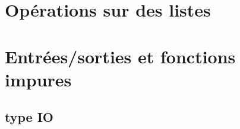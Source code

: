 \section{ Opérations sur des listes}
\label{sec:lists}

\section{ Entrées/sorties et fonctions impures}

\subsection{ type IO}

